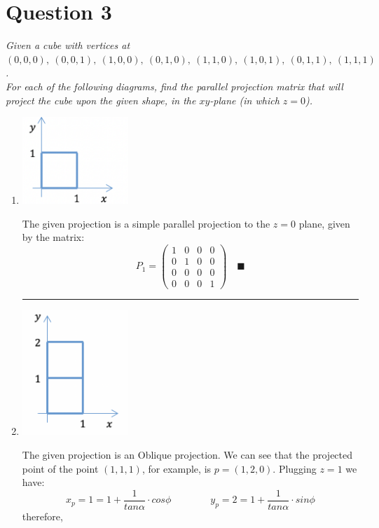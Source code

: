 \documentclass{article}
\newcommand{\proofend}{\quad\blacksquare}
\newcommand{\question}[1]{\section*{Question #1}\vspace{.5cm}}
\newcommand{\separator}{\vspace{.3cm}\begin{center}\noindent\rule{15cm}{0.4pt}\end{center}\vspace{.3cm}}
\newcommand{\twoColumns}[4]{
    \begin{minipage}{#1\linewidth}#3\end{minipage}
    \begin{minipage}{#2\linewidth}#4\end{minipage}
}
\begin{document}
    \newpage
    \question{3}
    \textsl{
    Given a cube with vertices at
    $(0,0,0),\ (0,0,1),\ (1,0,0),\ (0,1,0),\ (1,1,0),\ (1,0,1),\ (0,1,1),\ (1,1,1)$.\\
    For each of the following diagrams, find the parallel projection matrix that will project the cube upon the given shape, in the $xy$-plane (in which $z=0$).
    }
    \vspace{.5cm}
    \begin{enumerate}
        \item \twoColumns{0.25}{0.75}{
            \centering
            \includegraphics[width=4cm]{q3_1.png}
        }{
            The given projection is a simple parallel projection to the $z=0$ plane, given by the matrix:
            $$
                P_1 = \begin{pmatrix}
                    1&0&0&0\\
                    0&1&0&0\\
                    0&0&0&0\\
                    0&0&0&1
                \end{pmatrix}\proofend
            $$
        }
        \separator
        \item \twoColumns{0.25}{0.75}{
            \centering
            \includegraphics[width=4cm]{q3_2.png}
        }{
            The given projection is an Oblique projection. We can see that the projected point of the point $(1,1,1)$, for example, is $p = (1,2,0)$. Plugging $z=1$ we have:
            $$
                x_p = 1 = 1 + \dfrac{1}{tan\alpha}\cdot cos\phi\qquad\qquad
                y_p = 2 = 1 + \dfrac{1}{tan\alpha}\cdot sin\phi
            $$
            therefore,
            $$
$$}
\end{enumerate}
\end{document}
